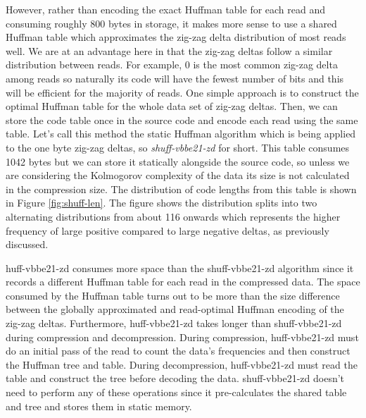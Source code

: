 However, rather than encoding the exact Huffman table for each read and consuming
roughly 800 bytes in storage, it makes more
sense to use a shared Huffman table which approximates the zig-zag delta
distribution of most reads well. We are at an advantage here in that the zig-zag
deltas follow a similar distribution between reads.
For example, 0 is the most common zig-zag delta among reads so naturally its code will
have the fewest number of bits and this will be efficient for the majority of
reads. One simple approach is to construct the optimal Huffman table for the
whole data set of zig-zag deltas. Then, we can store the code table once in the
source code and encode each read using the same table. Let's call this method
the static Huffman algorithm which is being applied to the one byte zig-zag
deltas, so \textit{shuff-vbbe21-zd} for short. This table consumes
1042 bytes but we can store it statically alongside the source code, so unless
we are considering the Kolmogorov complexity of the data its size is not
calculated in the compression size. The distribution of code lengths from this
table is shown in Figure \ref{fig:shuff-len}. The figure shows the distribution
splits into two alternating distributions from about 116 onwards which
represents the higher frequency of large positive compared to large negative
deltas, as previously discussed.

huff-vbbe21-zd consumes more space than the shuff-vbbe21-zd algorithm since it
records a different Huffman table for each read in the compressed data. The
space consumed by the Huffman table turns out to be more than the size difference
between the globally approximated and read-optimal Huffman encoding of the
zig-zag deltas.
Furthermore, huff-vbbe21-zd takes longer than shuff-vbbe21-zd during compression and decompression.
During compression, huff-vbbe21-zd must do an initial pass of the read to count the data's
frequencies and then construct the Huffman tree and table. During
decompression, huff-vbbe21-zd must read the table and construct the tree before decoding
the data. shuff-vbbe21-zd doesn't need to perform any of these operations since it
pre-calculates the shared table and tree and stores them in static memory.

